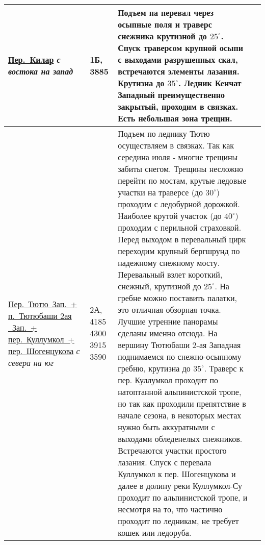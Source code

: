 \begin{longtable}{|>{\centering\arraybackslash}m{4.5cm}|>{\centering\arraybackslash}m{1.8cm}|>{\raggedright\arraybackslash}m{9.6cm}|>{\centering\arraybackslash}m{1.2cm}|}
			\hyperref[subsec:main_obstacles]{{\small Пер.~Килар}}																\newline\textit{с востока на запад}		&	1Б, 	3885		& {\small Подъем на перевал через осыпные поля и траверс снежника крутизной до $25^\circ$. Спуск траверсом крупной осыпи с выходами разрушенных скал, встречаются элементы лазания. Крутизна до $35^\circ$. Ледник Кенчат Западный преимущественно закрытый, проходим в связках. Есть небольшая зона трещин.}								&		\\ \hline
			\hyperref[subsec:main_obstacles]{{\small Пер.~Тютю~Зап.~+ п.~Тютюбаши 2ая ~Зап.~+ пер.~Куллумкол~+ пер.~Шогенцукова}}	\newline\textit{с севера на юг}			&	2А,	4185 4300 3915 3590	&	{\small Подъем по леднику Тютю осуществляем в связках. Так как середина июля - многие трещины забиты снегом. Трещины несложно перейти по мостам, крутые ледовые участки на траверсе (до $30^\circ$) проходим с ледобурной дорожкой. Наиболее крутой участок (до $40^\circ$) проходим с перильной страховкой. Перед выходом в перевальный цирк переходим крупный бергшрунд по надежному снежному мосту. Перевальный взлет короткий, снежный, крутизной до $25^\circ$. На гребне можно поставить палатки, это отличная обзорная точка. Лучшие утренние панорамы сделаны именно отсюда. На вершину Тютюбаши 2-ая Западная поднимаемся по снежно-осыпному гребню, крутизна до $35^\circ$. Траверс к пер. Куллумкол проходит по натоптанной альпинистской тропе, но так как проходили препятствие в начале сезона, в некоторых местах нужно быть аккуратными с выходами обледенелых снежников. Встречаются участки простого лазания. Спуск с перевала Куллумкол к пер. Шогенцукова и далее в долину реки Куллумкол-Су проходит по альпинистской тропе, и несмотря на то, что частично проходит по ледникам, не требует кошек или ледоруба.}					&		\\ \hline
		\end{longtable}
		

